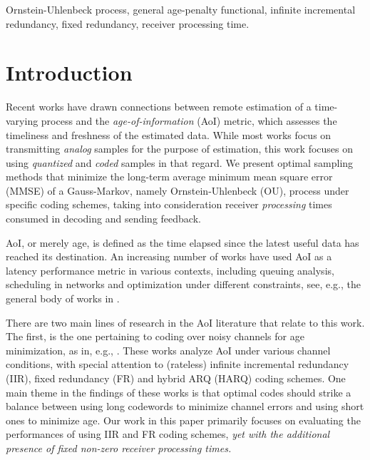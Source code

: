 \documentclass[12pt,journal,onecolumn]{IEEEtran}
\begin{document}
\begin{keywords}
Ornstein-Uhlenbeck process, general age-penalty functional, infinite incremental redundancy, fixed redundancy, receiver processing time.
\end{keywords}



\section{Introduction}

Recent works have drawn connections between remote estimation of a time-varying process and the {\it age-of-information} (AoI) metric, which assesses the timeliness and freshness of the estimated data. While most works focus on transmitting {\it analog} samples for the purpose of estimation, this work focuses on using {\it quantized} and {\it coded} samples in that regard. We present optimal sampling methods that minimize the long-term average minimum mean square error (MMSE) of a Gauss-Markov, namely Ornstein-Uhlenbeck (OU), process under specific coding schemes, taking into consideration receiver {\it processing} times consumed in decoding and sending feedback. 

AoI, or merely age, is defined as the time elapsed since the latest useful data has reached its destination. An increasing number of works have used AoI as a latency performance metric in various contexts, including queuing analysis, scheduling in networks and optimization under different constraints, see, e.g., the general body of works in \cite{yates_age_1, ephremides_age_random, yates_age_eh,  ephremides_age_management, ephremides_age_non_linear, modiano-age-bc, sun-age-mdp, jing-age-online, himanshu-age-source-coding, baknina-updt-info, zhou-age-iot, yates-age-mltpl-src, zhang-arafa-aoi-pricing-wiopt, batu-aoi-multihop, bacinoglu-aoi-eh-finite-gnrl-pnlty, sun-cyr-aoi-non-linear, leng-aoi-eh-cog-radio, bedewy-aoi-multihop, talak-aoi-delay, arafa-aoi-compute, inoue-aoi-general-formula-fcfs, arafa-age-online-finite, yang-arafa-aoi-fl, zou-waiting-aoi, soysal-aoi-gg11, tang-aoi-power-multi-state}.

There are two main lines of research in the AoI literature that relate to this work. The first, is the one pertaining to coding over noisy channels for age minimization, as in, e.g., \cite{parag-age-coding, najm-age-mg11-harq, yates-age-erase-code, baknina-age-coding, ceran-age-harq, sac-age-mg1-harq, simeone-age-finite-code, feng-age-rateless-codes, chen-aoi-coding-bc, arafa-aoi-coding, wang-aoi-coding-fbit, feng-coding-aoi-bc, najm-age-erasure-coding, javani-aoi-erasure}. These works analyze AoI under various channel conditions, with special attention to (rateless) infinite incremental redundancy (IIR), fixed redundancy (FR) and hybrid ARQ (HARQ) coding schemes. One main theme in the findings of these works is that optimal codes should strike a balance between using long codewords to minimize channel errors and using short ones to minimize age. Our work in this paper primarily focuses on evaluating the performances of using IIR and FR coding schemes, {\it yet with the additional presence of fixed non-zero receiver processing times.}
\end{document}
